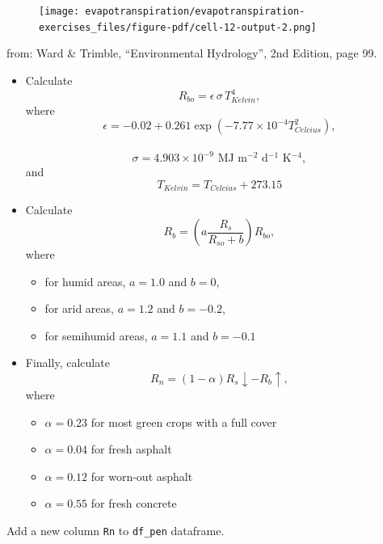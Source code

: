 \documentclass[
  letterpaper,
  DIV=11,
  numbers=noendperiod]{scrreprt}
\providecommand{\tightlist}{%
  \setlength{\itemsep}{0pt}\setlength{\parskip}{0pt}}\usepackage{longtable,booktabs,array}
\begin{document}
\begin{figure}[H]

{\centering \texttt{[image: evapotranspiration/evapotranspiration-exercises\_files/figure-pdf/cell-12-output-2.png]}

}

\end{figure}

from: Ward \& Trimble, ``Environmental Hydrology'', 2nd Edition, page
99.

\begin{itemize}
\tightlist
\item
  Calculate \[
  R_{bo} = \epsilon\, \sigma\, T^4_{Kelvin},
  \] where \[
  \epsilon=-0.02+0.261 \exp\left(-7.77\times10^{-4}T_{Celcius}^2\right),
  \]\\
  \[
  \sigma=4.903\times 10^{-9} \text{  MJ m$^{-2}$ d$^{-1}$ K$^{-4}$},
  \] and \[
  T_{Kelvin}=T_{Celcius}+273.15
  \]
\item
  Calculate \[
  R_b = \left( a\frac{R_s}{R_{so}+b} \right)R_{bo},
  \] where

  \begin{itemize}
  \tightlist
  \item
    for humid areas, \(a=1.0\) and \(b=0\),\\
  \item
    for arid areas, \(a=1.2\) and \(b=-0.2\),\\
  \item
    for semihumid areas, \(a=1.1\) and \(b=-0.1\)
  \end{itemize}
\item
  Finally, calculate \[
  R_n = (1-\alpha)R_s\!\! \downarrow -R_b \!\! \uparrow,
  \] where

  \begin{itemize}
  \tightlist
  \item
    \(\alpha= 0.23\) for most green crops with a full cover
  \item
    \(\alpha= 0.04\) for fresh asphalt
  \item
    \(\alpha= 0.12\) for worn-out asphalt
  \item
    \(\alpha= 0.55\) for fresh concrete
  \end{itemize}
\end{itemize}

Add a new column \texttt{Rn} to \texttt{df\_pen} dataframe.
\end{document}
